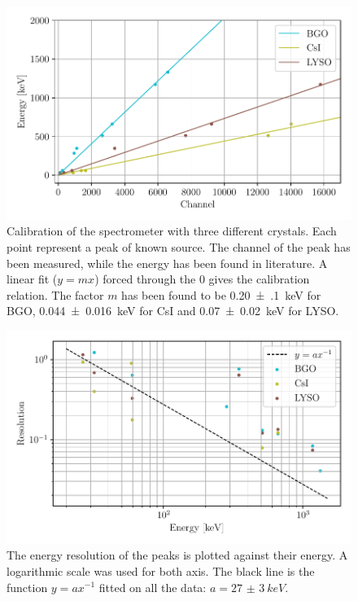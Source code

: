 \documentclass[a4paper, 11pt, table]{article}
\begin{document}
\begin{figure}[H]
    \centering
    \includegraphics[width=\textwidth]{figures/calibration.pdf}
    \caption{Calibration of the spectrometer with three different crystals. Each point represent a peak of known source. The channel of the peak has been measured, while the energy has been found in literature. A linear fit ($y = mx$) forced through the 0 gives the calibration relation. The factor $m$ has been found to be \SI{0.20(10)}{keV} for BGO, \SI{0.044(16)}{keV} for CsI and \SI{0.07(2)}{keV} for LYSO.}
    \label{fig:calibration}
\end{figure}

\begin{figure}[H]
    \centering
    \includegraphics[width=\textwidth]{figures/resolution.pdf}
    \caption{The energy resolution of the peaks is plotted against their energy. A logarithmic scale was used for both axis. The black line is the function $y=ax^{-1}$ fitted on all the data: $a=\SI{27(3)}{keV}$.}
    \label{fig:resolution}
\end{figure}
\end{document}
